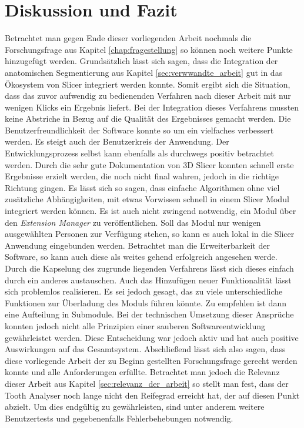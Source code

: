 \chapter{Diskussion und Fazit}
\label{chap:diskussion} Betrachtet man gegen Ende dieser vorliegenden Arbeit nochmals
die Forschungsfrage aus Kapitel \ref{chap:fragestellung} so können noch weitere Punkte
hinzugefügt werden. Grundsätzlich lässt sich sagen, dass die Integration der anatomischen
Segmentierung aus Kapitel \ref{sec:verwwandte_arbeit} gut in das Ökosystem von Slicer
integriert werden konnte. Somit ergibt sich die Situation, dass das zuvor aufwendig
zu bedienenden Verfahren nach dieser Arbeit mit nur wenigen Klicks ein Ergebnis liefert.
Bei der Integration dieses Verfahrens mussten keine Abstriche in Bezug auf die
Qualität des Ergebnisses gemacht werden. Die Benutzerfreundlichkeit der Software
konnte so um ein vielfaches verbessert werden. Es steigt auch der Benutzerkreis
der Anwendung. Der Entwicklungsprozess selbst kann ebenfalls als durchwegs positiv
betrachtet werden. Durch die sehr gute Dokumentation von 3D Slicer konnten
schnell erste Ergebnisse erzielt werden, die noch nicht final wahren, jedoch in
die richtige Richtung gingen. Es lässt sich so sagen, dass einfache Algorithmen
ohne viel zusätzliche Abhängigkeiten, mit etwas Vorwissen schnell in einem Slicer
Modul integriert werden können. Es ist auch nicht zwingend notwendig, ein Modul über
den \textit{Extension Manager} zu veröffentlichen. Soll das Modul nur wenigen ausgewählten
Personen zur Verfügung stehen, so kann es auch lokal in die Slicer Anwendung
eingebunden werden. Betrachtet man die Erweiterbarkeit der Software, so kann
auch diese als weites gehend erfolgreich angesehen werde. Durch die Kapselung des
zugrunde liegenden Verfahrens lässt sich dieses einfach durch ein anderes austauschen.
Auch das Hinzufügen neuer Funktionalität lässt sich problemlos realisieren. Es sei
jedoch gesagt, das zu viele unterschiedliche Funktionen zur Überladung des
Moduls führen könnte. Zu empfehlen ist dann eine Aufteilung in Submodule. Bei
der technischen Umsetzung dieser Ansprüche konnten jedoch nicht alle Prinzipien
einer sauberen Softwareentwicklung gewährleistet werden. Diese Entscheidung war jedoch
aktiv und hat auch positive Auswirkungen auf das Gesamtsystem. Abschließend
lässt sich also sagen, dass diese vorliegende Arbeit der zu Beginn gestellten Forschungsfrage
gerecht werden konnte und alle Anforderungen erfüllte. Betrachtet man jedoch die
Relevanz dieser Arbeit aus Kapitel \ref{sec:relevanz_der_arbeit} so stellt man
fest, dass der Tooth Analyser noch lange nicht den Reifegrad erreicht hat, der
auf diesen Punkt abzielt. Um dies endgültig zu gewährleisten, sind unter anderem
weitere Benutzertests und gegebenenfalls Fehlerbehebungen notwendig.
